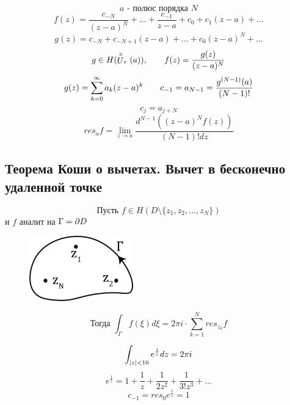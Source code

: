 \documentclass[main]{subfiles}
\begin{document}
    \begin{Definition}
        \[a \text{ - полюс порядка }N\]
        \[f(z) = \frac{c_{-N} }{(z - a)^N} + ... + \frac{c_{-1} }{z - a} + c_0 + c_1(z - a) + ...\]
        \[g(z) = c_{-N} + c_{-N + 1}(z - a) + ... + c_0 (z - a)^N + ...  \]
        \[g \in H(\stackrel{\circ}{U}_r(a)), \qquad f(z) = \frac{g(z)}{(z - a)^N}\]
        \[g(z) = \sum_{k = 0}^\infty a_k (z - a)^k \qquad c_{-1} = a_{N - 1} =
        \frac{g^{(N - 1)}(a) }{(N - 1)!}\]
        \[c_j = a_{j + N} \]
        \[res_a f = \lim_{z \to a} \frac{d^{N - 1}( (z - a)^N f(z))}{(N - 1)!dz} \]
    \end{Definition}

    \newpage
    \subsection{Теорема Коши о вычетах. Вычет в бесконечно удаленной точке}

    \begin{Theorem}
        \[\text{Пусть } f \in H(D\setminus \{z_1, z_2, ..., z_N\})\]
        и $f $ аналит на $\Gamma = \partial D$
        \begin{figure}[H]
            \includegraphics[width=4.5cm]{pics/13_4}
            \centering
        \end{figure}
        \[\text{Тогда } \int_{\Gamma} f(\xi)d\xi = 2\pi i \cdot \sum_{k = 1}^N  res_{z_k} f  \]
    \end{Theorem}

    \begin{Example}
        \[\int_{\left|z\right| < 10}  e^{\frac{1}{z}}dz = 2\pi i\]
        \[e^{\frac{1}{z}}  = 1 + \frac{1}{z}  + \frac{1}{2z^2} + \frac{1}{3!z^3} + ...\]
        \[c_{-1} = res_0e^{\frac{1}{z}}  = 1 \]
    \end{Example}
\end{document}
